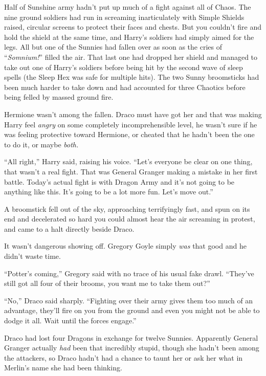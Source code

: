 Half of Sunshine army hadn’t put up much of a fight against all of Chaos. The nine ground soldiers had run in screaming inarticulately with Simple Shields raised, circular screens to protect their faces and chests. But you couldn’t fire and hold the shield at the same time, and Harry’s soldiers had simply aimed for the legs. All but one of the Sunnies had fallen over as soon as the cries of “\emph{Somnium!}” filled the air. That last one had dropped her shield and managed to take out one of Harry’s soldiers before being hit by the second wave of sleep spells (the Sleep Hex was safe for multiple hits). The two Sunny broomsticks had been much harder to take down and had accounted for three Chaotics before being felled by massed ground fire.

Hermione wasn’t among the fallen. Draco must have got her and that was making Harry feel \emph{angry} on some completely incomprehensible level, he wasn’t sure if he was feeling protective toward Hermione, or cheated that he hadn’t been the one to do it, or maybe \emph{both.}

“All right,” Harry said, raising his voice. “Let’s everyone be clear on one thing, that wasn’t a real fight. That was General Granger making a mistake in her first battle. Today’s actual fight is with Dragon Army and it’s not going to be anything like this. It’s going to be a lot more fun. Let’s move out.”

\later

A broomstick fell out of the sky, approaching terrifyingly fast, and spun on its end and decelerated so hard you could almost hear the air screaming in protest, and came to a halt directly beside Draco.

It wasn’t dangerous showing off. Gregory Goyle simply \emph{was} that good and he didn’t waste time.

“Potter’s coming,” Gregory said with no trace of his usual fake drawl. “They’ve still got all four of their brooms, you want me to take them out?”

“No,” Draco said sharply. “Fighting over their army gives them too much of an advantage, they’ll fire on you from the ground and even you might not be able to dodge it all. Wait until the forces engage.”

Draco had lost four Dragons in exchange for twelve Sunnies. Apparently General Granger actually \emph{had} been that incredibly stupid, though she hadn’t been among the attackers, so Draco hadn’t had a chance to taunt her or ask her what in Merlin’s name she had been thinking.

